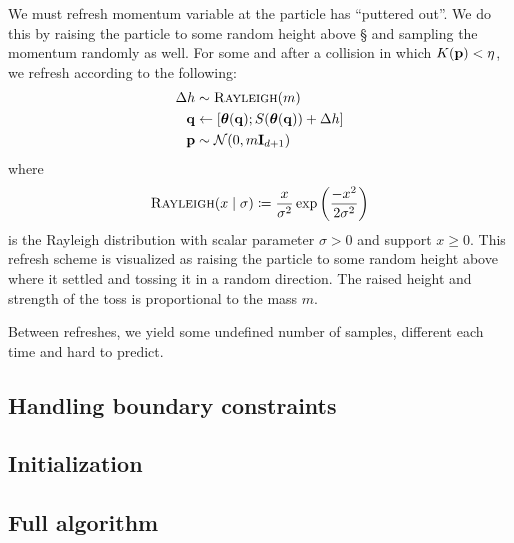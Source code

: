 We must refresh momentum variable at the particle has ``puttered out''. We do
this by raising the particle to some random height above \S{} and sampling the
momentum randomly as well. For some \q{} and \p{} after a collision in which
$K(\mathbf{p}{}) < \eta$, we refresh according to the following:
\begin{align*}
    \Delta h &\sim \textsc{Rayleigh}(m) \\
    \mathbf{q}{} &\gets [\boldsymbol{\theta}(\mathbf{q}); S(\boldsymbol{\theta}(\mathbf{q})) + \Delta h] \\
    \mathbf{p}{} &\sim \mathcal{N}(0, m\mathbf{I}_{d+1})
\end{align*}
where
\begin{equation*}
    \textsc{Rayleigh}(x \mid \sigma) \coloneqq \frac{x}{\sigma^2}\exp\left(\frac{-x^2}{2\sigma^2}\right)
\end{equation*}
is the Rayleigh distribution with scalar parameter $\sigma > 0$ and support $x
\geq 0$. This refresh scheme is visualized as raising the particle to some
random height above where it settled and tossing it in a random direction. The
raised height and strength of the toss is proportional to the mass $m$.

Between refreshes, we yield some undefined number of samples, different each
time and hard to predict.

\subsection{Handling boundary constraints} \label{ss:constraints}

\subsection{Initialization} \label{ss:initialization}

\subsection{Full algorithm} \label{ss:algo}
